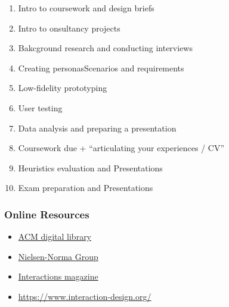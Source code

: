 \documentclass[a4paper]{article}
\begin{document}
\begin{enumerate}
    \item Intro to coursework and design briefs
    \item Intro to onsultancy projects
    \item Bakcground research and conducting interviews
    \item Creating personasScenarios and requirements
    \item Low-fidelity prototyping
    \item User testing
    \item Data analysis and preparing a presentation
    \item Coursework due + ``articulating your experiences / CV''
    \item Heuristics evaluation and Presentations
    \item Exam preparation and Presentations
\end{enumerate}

\subsubsection{Online Resources}
\begin{itemize}
    \item \href{https://dl.acm.org}{ACM digital library}
    \item \href{https://www.nngroup.com/articles/}{Nielsen-Norma Group}
    \item \href{https://interactions.acm.org}{Interactions magazine}
    \item \href{Interaction Design Foundation}{https://www.interaction-design.org/}
\end{itemize}


\end{document}
